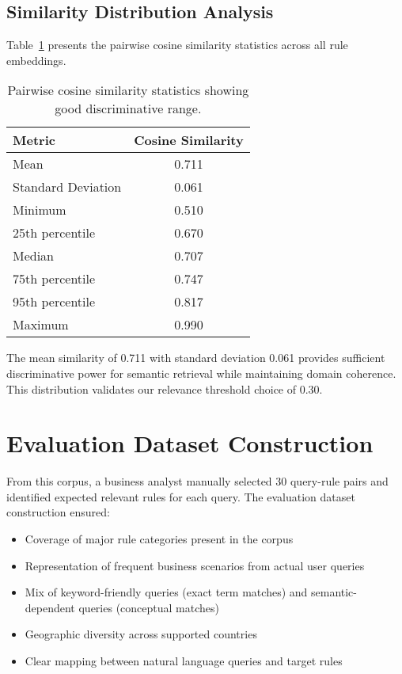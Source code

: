 \subsection{Similarity Distribution Analysis}

Table~\ref{tab:similarity-stats} presents the pairwise cosine similarity statistics across all rule embeddings.

\begin{table}[h]
\centering
\begin{tabular}{lc}
\toprule
\textbf{Metric} & \textbf{Cosine Similarity} \\
\midrule
Mean & 0.711 \\
Standard Deviation & 0.061 \\
Minimum & 0.510 \\
25th percentile & 0.670 \\
Median & 0.707 \\
75th percentile & 0.747 \\
95th percentile & 0.817 \\
Maximum & 0.990 \\
\bottomrule
\end{tabular}
\caption{Pairwise cosine similarity statistics showing good discriminative range.}
\label{tab:similarity-stats}
\end{table}

The mean similarity of 0.711 with standard deviation 0.061 provides sufficient discriminative power for semantic retrieval while maintaining domain coherence. This distribution validates our relevance threshold choice of 0.30.

\section{Evaluation Dataset Construction}

From this corpus, a business analyst manually selected 30 query-rule pairs and identified expected relevant rules for each query. The evaluation dataset construction ensured:
\begin{itemize}[leftmargin=*,itemsep=2pt,topsep=2pt]
 \item Coverage of major rule categories present in the corpus
 \item Representation of frequent business scenarios from actual user queries
 \item Mix of keyword-friendly queries (exact term matches) and semantic-dependent queries (conceptual matches)
 \item Geographic diversity across supported countries
 \item Clear mapping between natural language queries and target rules
\end{itemize}

